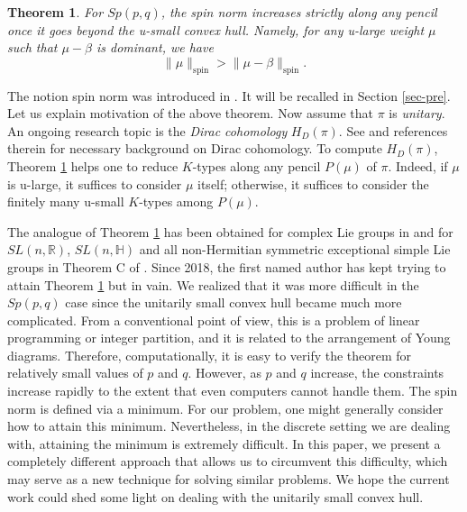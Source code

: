 \documentclass[11pt]{amsart}
\theoremstyle{plain}
\newtheorem{thm}{Theorem}[section]
\theoremstyle{definition}
\newcommand{\bbH}{\mathbb{H}}
\newcommand{\bbR}{\mathbb{R}}
\begin{document}
\begin{thm}\label{thm-reduction-pencil-sppq}
For $Sp(p, q)$, the
spin norm increases strictly along any pencil once it goes beyond
the u-small convex hull. Namely,  for any u-large weight $\mu$ such
that $\mu-\beta$ is dominant, we have
\begin{equation}\label{pencil-reduction-step-complex}
\| \mu \|_{\mathrm{spin}} > \|\mu-\beta \|_{\mathrm{spin}}.
\end{equation}
\end{thm}

The notion spin norm was introduced in \cite{D13}. It will be recalled in Section \ref{sec-pre}. Let us explain motivation of the above theorem. Now assume that $\pi$ is \emph{unitary}. An ongoing research topic is the \emph{Dirac cohomology} $H_D(\pi)$. See \cite{V97,HP} and references therein for necessary background on Dirac cohomology. To compute $H_D(\pi)$, Theorem \ref{thm-reduction-pencil-sppq} helps one to reduce $K$-types along any pencil $P(\mu)$ of $\pi$. Indeed, if $\mu$ is u-large, it suffices to consider $\mu$ itself; otherwise, it suffices to consider the finitely many u-small $K$-types among $P(\mu)$.

The analogue of  Theorem \ref{thm-reduction-pencil-sppq} has been obtained for complex Lie groups in \cite{D16} and for $SL(n, \bbR)$, $SL(n, \bbH)$ and all non-Hermitian symmetric exceptional simple Lie groups in Theorem C of \cite{D20}. Since 2018, the first named author has kept trying to attain Theorem \ref{thm-reduction-pencil-sppq} but in vain. We realized that it was more difficult in the $Sp(p, q)$ case since the unitarily small convex hull became much more complicated. From a conventional point of view, this is a problem of linear programming or integer partition, and it is related to the arrangement of Young diagrams. Therefore, computationally, it is easy to verify the theorem for relatively small values of $p$ and $q$. However, as $p$ and $q$ increase, the constraints increase rapidly to the extent that even computers cannot handle them. The spin norm is defined via a minimum. For our problem, one might generally consider how to attain this minimum. Nevertheless, in the discrete setting we are dealing with, attaining the minimum is extremely difficult. In this paper, we present a completely different approach that allows us to circumvent this difficulty, which may serve as a new technique for solving similar problems. We hope the current work could shed some light on dealing with the unitarily small convex hull.
\end{document}
